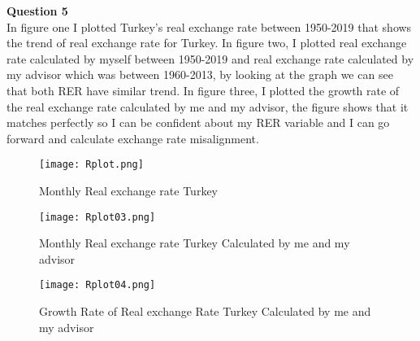 \documentclass{article}
\begin{document}
\noindent
\textbf{Question 5}\\
In figure one I plotted Turkey's real exchange rate between 1950-2019 that shows the trend of real exchange rate for Turkey. In figure two, I plotted real exchange rate calculated by myself between 1950-2019 and real exchange rate calculated by my advisor which was between 1960-2013, by looking at the graph we can see that both RER have similar trend. In figure three, I plotted the growth rate of the real exchange rate calculated by me and my advisor, the figure shows that it matches perfectly so I can be confident about my RER variable and I can go forward and calculate exchange rate misalignment.\\ 
\begin{figure}[h!]
\centering
\texttt{[image: Rplot.png]}
\caption{Monthly Real exchange rate Turkey}
\label{figure one}
\end{figure}
\begin{figure}[h!]
\centering
\texttt{[image: Rplot03.png]}
\caption{Monthly Real exchange rate Turkey Calculated by me and my advisor}
\label{figure one}
\end{figure}


\begin{figure}[h!]
\centering
\texttt{[image: Rplot04.png]}
\caption{Growth Rate of Real exchange Rate Turkey Calculated by me and my advisor}
\label{figure one}
\end{figure}



\end{document}
